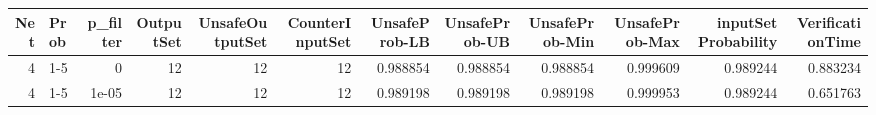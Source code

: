 \begin{tabular}{rlrrrrrrrrrr}
\hline
   Net & Prob   &   p\_filter &   OutputSet &   UnsafeOutputSet &   CounterInputSet &   UnsafeProb-LB &   UnsafeProb-UB &   UnsafeProb-Min &   UnsafeProb-Max &   inputSet Probability &   VerificationTime \\
\hline
     4 & 1-5    &      0     &          12 &                12 &                12 &        0.988854 &        0.988854 &         0.988854 &         0.999609 &               0.989244 &           0.883234 \\
     4 & 1-5    &      1e-05 &          12 &                12 &                12 &        0.989198 &        0.989198 &         0.989198 &         0.999953 &               0.989244 &           0.651763 \\
\hline
\end{tabular}
